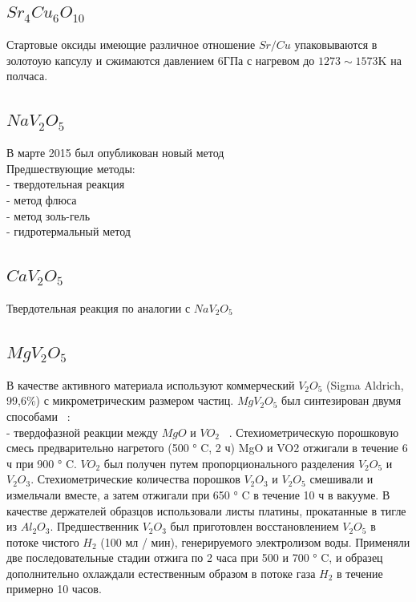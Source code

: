 \documentclass[11pt]{article}
\begin{document}
\subsection{$Sr_4Cu_6O_{10}$}
Стартовые оксиды имеющие различное отношение $Sr/Cu$ упаковываются в золотоую капсулу и сжимаются давлением 6ГПа с нагревом до $1273 \sim 1573$K на полчаса.


\subsection{$NaV_2O_5$}
В марте 2015 был опубликован новый метод ~\cite{acsami_5b01260} \\

Предшествующие методы: \\

- твердотельная реакция ~\cite{raistrick1983} \\

- метод флюса ~\cite{rabia2009} \\

- метод золь-гель ~\cite{pereira_ramos1988, bach1990} \\

- гидротермальный метод ~\cite{xu2011} \\

\subsection{$CaV_2O_5$}
Твердотельная реакция по аналогии с $NaV_2O_5$

\subsection{$MgV_2O_5$}
В качестве активного материала используют коммерческий $V_2O_5$ (Sigma Aldrich, 99,6\%) с микрометрическим размером частиц. $MgV_2O_5$ был синтезирован двумя способами ~\cite{verrelli2018}: \\

- твердофазной реакции между $MgO$ и $VO_2$ ~\cite{bouloux1976}. Стехиометрическую порошковую смесь предварительно нагретого (500 ° C, 2 ч) MgO и VO2 отжигали в течение 6 ч при 900 ° C. $VO_2$ был получен путем пропорционального разделения $V_2O_5$ и $V_2O_3$. Стехиометрические количества порошков $V_2O_3$ и $V_2O_5$ смешивали и измельчали вместе, а затем отжигали при 650 ° C в течение 10 ч в вакууме. В качестве держателей образцов использовали листы платины, прокатанные в тигле из $Al_2O_3$. Предшественник $V_2O_3$ был приготовлен восстановлением $V_2O_5$ в потоке чистого $H_2$ (100 мл / мин), генерируемого электролизом воды. Применяли две последовательные стадии отжига по 2 часа при 500 и 700 ° C, и образец дополнительно охлаждали естественным образом в потоке газа $H_2$ в течение примерно 10 часов.\\
\end{document}

